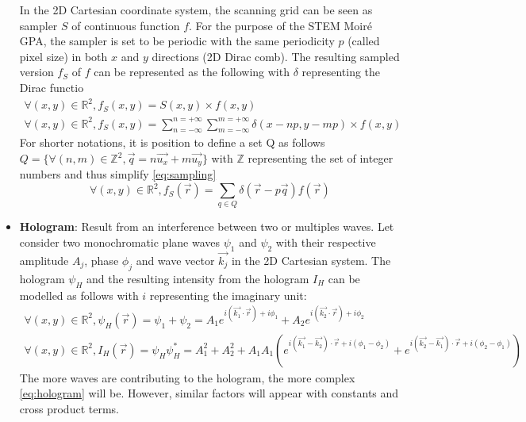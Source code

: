 \documentclass[12pt]{article}
\begin{document}
\begin{itemize}
\begin{figure}[H]
\label{fig:STEM_imaging_Fig}
\end{figure}
In the 2D Cartesian coordinate system, the scanning grid can be seen as sampler $S$ of continuous function $f$. For the purpose of the STEM Moir{\'e} GPA, the sampler is set to be periodic with the same periodicity $p$ (called pixel size) in both $x$ and $y$ directions (2D Dirac comb). The resulting sampled version $f_S$ of $f$ can be represented as the following with $\delta$ representing the Dirac functio
\begin{equation}
\begin{gathered}
\forall (x,y) \in \mathbb{R}^{2}, f_S(x,y)=S(x,y)\times f(x,y) \\
\forall (x,y) \in \mathbb{R}^{2}, f_S(x,y)=\sum_{n=-\infty}^{n=+\infty}\sum_{m=-\infty}^{m=+\infty}\delta(x-np,y-mp)\times f(x,y)
\end{gathered}
\label{eq:sampling}
\end{equation}
For shorter notations, it is position to define a set Q as follows $Q=\{\forall (n,m) \in \mathbb{Z}^{2}, \vec{q}=n\vec{u_x}+m\vec{u_y}\}$ with $\mathbb{Z}$ representing the set of integer numbers and thus simplify \cref{eq:sampling}
\begin{equation}
\forall (x,y) \in \mathbb{R}^{2}, f_S(\vec{r})=\sum_{q\in Q}\delta(\vec{r}-p\vec{q}) f(\vec{r})
\label{eq:sampling_simplified}
\end{equation}
\item \textbf{Hologram}: Result from an interference between two or multiples waves. \newline
Let consider two monochromatic plane waves $\psi_1$ and $\psi_2$ with their respective amplitude $A_j$, phase $\phi_j$ and wave vector $\vec{k_j}$ in the 2D Cartesian system. The hologram $\psi_H$ and the resulting intensity from the hologram $I_H$ can be modelled as follows with $i$ representing the imaginary unit:
\begin{equation}
\begin{gathered}
\forall (x,y) \in \mathbb{R}^{2},\psi_H(\vec{r})=\psi_1+\psi_2= A_1e^{i(\vec{k_1}\cdot\vec{r})+i\phi_1}+A_2e^{i(\vec{k_2}\cdot\vec{r})+i\phi_2} \\
\forall (x,y) \in \mathbb{R}^{2},I_H(\vec{r})=\psi_H\psi_H^{*}= A_{1}^{2}+A_{2}^{2}+A_{1}A_{1}(e^{i(\vec{k_1}-\vec{k_2})\cdot\vec{r}+i(\phi_1-\phi_2)}+e^{i(\vec{k_2}-\vec{k_1})\cdot\vec{r}+i(\phi_2-\phi_1)})
\end{gathered}
\label{eq:hologram}
\end{equation}
The more waves are contributing to the hologram, the more complex \cref{eq:hologram} will be. However, similar factors will appear with constants and cross product terms. 

\end{itemize}
\end{document}
